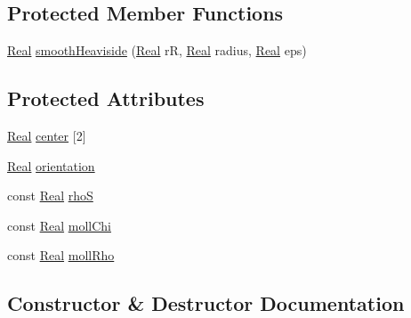 \subsection*{Protected Member Functions}
\begin{DoxyCompactItemize}
\item 
\hyperlink{_h_d_f5_dumper_8h_a445a5f0e2a34c9d97d69a3c2d1957907}{Real} \hyperlink{class_shape_acbce5e61869b11226e3a45090387c7e9}{smooth\+Heaviside} (\hyperlink{_h_d_f5_dumper_8h_a445a5f0e2a34c9d97d69a3c2d1957907}{Real} r\+R, \hyperlink{_h_d_f5_dumper_8h_a445a5f0e2a34c9d97d69a3c2d1957907}{Real} radius, \hyperlink{_h_d_f5_dumper_8h_a445a5f0e2a34c9d97d69a3c2d1957907}{Real} eps)
\end{DoxyCompactItemize}
\subsection*{Protected Attributes}
\begin{DoxyCompactItemize}
\item 
\hyperlink{_h_d_f5_dumper_8h_a445a5f0e2a34c9d97d69a3c2d1957907}{Real} \hyperlink{class_shape_a865a04fe67fc785b3cbb44806a214248}{center} \mbox{[}2\mbox{]}
\item 
\hyperlink{_h_d_f5_dumper_8h_a445a5f0e2a34c9d97d69a3c2d1957907}{Real} \hyperlink{class_shape_a1778439509ada1f3fa64472610221d19}{orientation}
\item 
const \hyperlink{_h_d_f5_dumper_8h_a445a5f0e2a34c9d97d69a3c2d1957907}{Real} \hyperlink{class_shape_a181acdc3063f20a15ba1807f7b6a5d10}{rho\+S}
\item 
const \hyperlink{_h_d_f5_dumper_8h_a445a5f0e2a34c9d97d69a3c2d1957907}{Real} \hyperlink{class_shape_ad7d270a8ffc4056d4990424dffdd0488}{moll\+Chi}
\item 
const \hyperlink{_h_d_f5_dumper_8h_a445a5f0e2a34c9d97d69a3c2d1957907}{Real} \hyperlink{class_shape_af5aa25175d49bc463fada7b11f2735e1}{moll\+Rho}
\end{DoxyCompactItemize}


\subsection{Constructor \& Destructor Documentation}
\hypertarget{class_shape_a5569f27971a19b8a929c98715c73e357}{}
